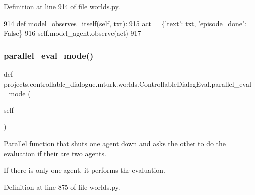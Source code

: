Definition at line 914 of file worlds.\+py.


\begin{DoxyCode}
914     \textcolor{keyword}{def }model\_observes\_itself(self, txt):
915         act = \{\textcolor{stringliteral}{'text'}: txt, \textcolor{stringliteral}{'episode\_done'}: \textcolor{keyword}{False}\}
916         self.model\_agent.observe(act)
917 
\end{DoxyCode}
\mbox{\label{classprojects_1_1controllable__dialogue_1_1mturk_1_1worlds_1_1ControllableDialogEval_ac7bd664aea619365216c1c268290b728}} 
\subsubsection{\texorpdfstring{parallel\+\_\+eval\+\_\+mode()}{parallel\_eval\_mode()}}
{\footnotesize\ttfamily def projects.\+controllable\+\_\+dialogue.\+mturk.\+worlds.\+Controllable\+Dialog\+Eval.\+parallel\+\_\+eval\+\_\+mode (\begin{DoxyParamCaption}\item[{}]{self }\end{DoxyParamCaption})}

\begin{DoxyVerb}Parallel function that shuts one agent down and asks the other to do the
evaluation if their are two agents.

If there is only one agent, it performs the evaluation.
\end{DoxyVerb}
 

Definition at line 875 of file worlds.\+py.


